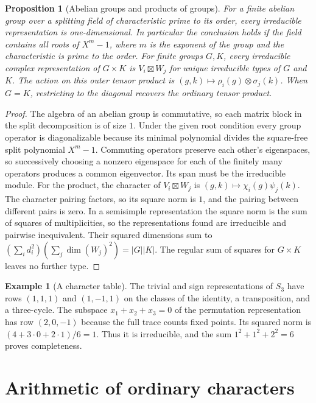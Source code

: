 \documentclass[11pt,oneside,openany]{book}
\newtheorem{proposition}[theorem]{Proposition}
\theoremstyle{definition}
\newtheorem{example}[theorem]{Example}
\theoremstyle{remark}
\begin{document}
\begin{proposition}[Abelian groups and products of groups]
\label{p103:ALG-07-C01-S02}
For a finite abelian group over a splitting field of characteristic
prime to its order, every irreducible representation is
one-dimensional. In particular the conclusion holds if the field
contains all roots of \(X^m-1\), where \(m\) is the exponent of the group
and the characteristic is prime to the order. For finite groups
\(G,K\), every irreducible complex representation of \(G\times K\)
is \(V_i\boxtimes W_j\) for unique irreducible types of \(G\) and \(K\).
The action on this outer tensor product is
\((g,k)\mapsto\rho_i(g)\otimes\sigma_j(k)\). When \(G=K\),
restricting to the diagonal recovers the ordinary tensor product.
\end{proposition}

\begin{proof}
The algebra of an abelian group is commutative, so each matrix
block in the split decomposition is of size \(1\). Under the given
root condition every group operator is diagonalizable because its
minimal polynomial divides the square-free split polynomial \(X^m-1\).
Commuting operators preserve each other's eigenspaces, so successively
choosing a nonzero eigenspace for each of the finitely many operators
produces a common eigenvector. Its span must be the irreducible module.
For the product, the character of \(V_i\boxtimes W_j\) is
\((g,k)\mapsto\chi_i(g)\psi_j(k)\). The character pairing factors, so
its square norm is \(1\), and the pairing between different pairs is
zero. In a semisimple representation the square norm is the sum of
squares of multiplicities, so the representations found are
irreducible and pairwise inequivalent. Their squared dimensions sum to
\((\sum_i d_i^2)(\sum_j \dim(W_j)^2)=|G||K|\).
The regular sum of squares for \(G\times K\) leaves no further type.
\end{proof}

\begin{example}[A character table]
The trivial and sign representations of \(S_3\) have rows
\((1,1,1)\) and \((1,-1,1)\) on the classes of the identity,
a transposition, and a three-cycle. The subspace
\(x_1+x_2+x_3=0\) of the permutation representation has row
\((2,0,-1)\) because the full trace counts fixed points.
Its squared norm is \((4+3\cdot0+2\cdot1)/6=1\). Thus it is
irreducible, and the sum \(1^2+1^2+2^2=6\) proves completeness.
\end{example}

\section{Arithmetic of ordinary characters}
\end{document}
